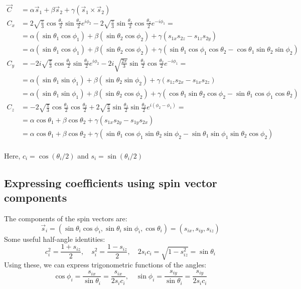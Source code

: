 \documentclass[12pt]{article}
\begin{document}
    \[
    \begin{aligned}
        \vec{C} &= \alpha \vec{s}_1 + \beta \vec{s}_2 + \gamma (\vec{s}_1 \times \vec{s}_2) \\
        C_x &= 2 \sqrt{\frac{\pi}{3}} \cos \frac{\theta_1}{2} \sin \frac{\theta_2}{2} e^{i \phi_2} - 2 \sqrt{\frac{\pi}{3}} \sin \frac{\theta_1}{2} \cos \frac{\theta_2}{2} e^{-i \phi_1} = \\
        &= \alpha \left(\sin \theta_1 \cos \phi_1\right) + \beta \left(\sin \theta_2 \cos \phi_2\right) + \gamma (s_{1x}  s_{2z} - s_{1z} s_{2y}) \\
        &= \alpha \left(\sin \theta_1 \cos \phi_1\right) + \beta \left(\sin \theta_2 \cos \phi_2\right) + \gamma (\sin \theta_1 \cos \phi_1 \cos \theta_2 - \cos \theta_1 \sin \theta_2 \sin \phi_2) \\
        C_y &= -2 i \sqrt{\frac{\pi}{3}} \cos \frac{\theta_1}{2} \sin \frac{\theta_2}{2} e^{i \phi_2} - 2i \sqrt{\frac{2 \pi}{3}} \sin \frac{\theta_1}{2} \cos \frac{\theta_2}{2} e^{-i \phi_1} = \\
        &= \alpha \left(\sin \theta_1 \sin \phi_1\right) + \beta \left(\sin \theta_2 \sin \phi_2\right) + \gamma (s_{1z}  s_{2x} - s_{1x} s_{2z}) \\
        &= \alpha \left(\sin \theta_1 \sin \phi_1\right) + \beta \left(\sin \theta_2 \cos \phi_2\right) + \gamma (\cos \theta_1 \sin \theta_2 \cos \phi_2 - \sin \theta_1 \cos \phi_1 \cos \theta_2) \\
        C_z &= -2 \sqrt{\frac{\pi}{3}} \cos \frac{\theta_1}{2} \cos \frac{\theta_2}{2} + 2 \sqrt{\frac{\pi}{3}} \sin \frac{\theta_1}{2} \sin \frac{\theta_2}{2} e^{i(\phi_2 - \phi_1)} = \\
        &= \alpha \cos \theta_1 + \beta \cos \theta_2 + \gamma (s_{1x}  s_{2y} - s_{1y} s_{2x}) \\
        &= \alpha \cos \theta_1 + \beta \cos \theta_2 + \gamma (\sin \theta_1 \cos \phi_1 \sin \theta_2 \sin \phi_2 - \sin \theta_1 \sin \phi_1 \sin \theta_2 \cos \phi_2) \\
    \end{aligned}
    \]
    
	Here, $c_i = \cos(\theta_i/2)$ and $s_i = \sin(\theta_i/2)$
	\subsection{Expressing coefficients using spin vector components}
	The components of the spin vectors are:
	\[
	\vec{s}_i = \left(\sin \theta_i \cos \phi_i, \sin \theta_i \sin \phi_i, \cos \theta_i\right) = \left(s_{ix}, s_{iy},s_{iz}\right)
	\]
	Some useful half-angle identities:
	\[
	c_i^2 = \frac{1 + s_{iz}}{2}, \quad s_i^2 = \frac{1-s_{iz}}{2}, \quad 2 s_i c_i = \sqrt{1 - s^2_{iz}} = \sin \theta_i
	\]
	Using these, we can express trigonometric functions of the angles:
	\[
	\cos \phi_i = \frac{s_{ix}}{\sin \theta_i} = \frac{s_{ix}}{2 s_i c_i}, \quad \sin \phi_i = \frac{s_{iy}}{\sin \theta_i} = \frac{s_{iy}}{2 s_i c_i} 
	\]
\end{document}

